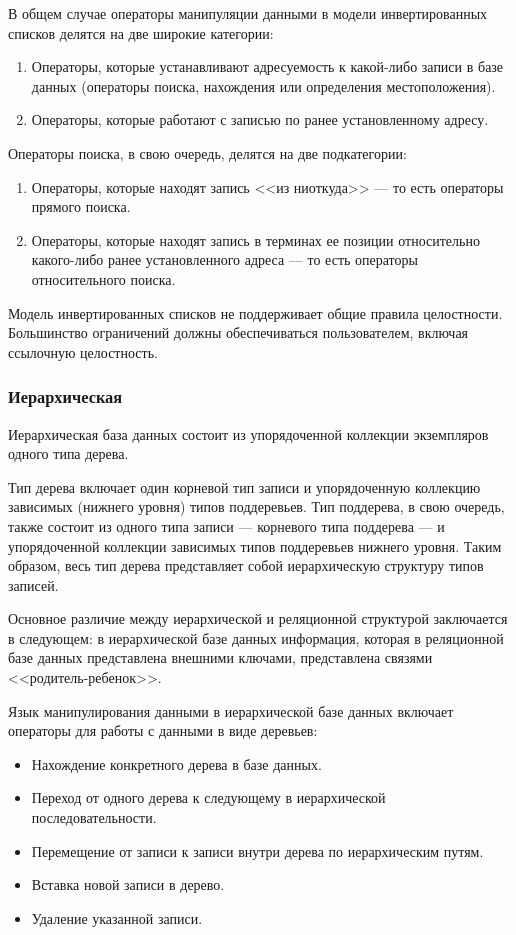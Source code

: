 В общем случае операторы манипуляции данными в модели инвертированных списков делятся на две широкие категории:
\begin{enumerate}
    \item Операторы, которые устанавливают адресуемость к какой-либо записи в базе данных (операторы поиска, нахождения или определения местоположения).
    \item Операторы, которые работают с записью по ранее установленному адресу.
\end{enumerate}

Операторы поиска, в свою очередь, делятся на две подкатегории:
\begin{enumerate}[label=\asbuk*)]
    \item Операторы, которые находят запись <<из ниоткуда>> --- то есть операторы прямого поиска.
    \item Операторы, которые находят запись в терминах ее позиции относительно какого-либо ранее установленного адреса --- то есть операторы относительного поиска.~\cite{date-wr}
\end{enumerate}

Модель инвертированных списков не поддерживает общие правила целостности.
Большинство ограничений должны обеспечиваться пользователем, включая ссылочную целостность.~\cite{date-wr}

\subsubsection{Иерархическая}

Иерархическая база данных состоит из упорядоченной коллекции экземпляров одного типа дерева.

Тип дерева включает один корневой тип записи и упорядоченную коллекцию зависимых (нижнего уровня) типов поддеревьев.
Тип поддерева, в свою очередь, также состоит из одного типа записи --- корневого типа поддерева --- и упорядоченной коллекции зависимых типов поддеревьев нижнего уровня.
Таким образом, весь тип дерева представляет собой иерархическую структуру типов записей.~\cite{date-wr}

Основное различие между иерархической и реляционной структурой заключается в следующем: в иерархической базе данных информация, которая в реляционной базе данных представлена внешними ключами, представлена связями <<родитель-ребенок>>.~\cite{date-wr}

Язык манипулирования данными в иерархической базе данных включает операторы для работы с данными в виде деревьев:
\begin{itemize}
    \item Нахождение конкретного дерева в базе данных.
    \item Переход от одного дерева к следующему в иерархической последовательности.
    \item Перемещение от записи к записи внутри дерева по иерархическим путям.
    \item Вставка новой записи в дерево.
    \item Удаление указанной записи.
\end{itemize}

